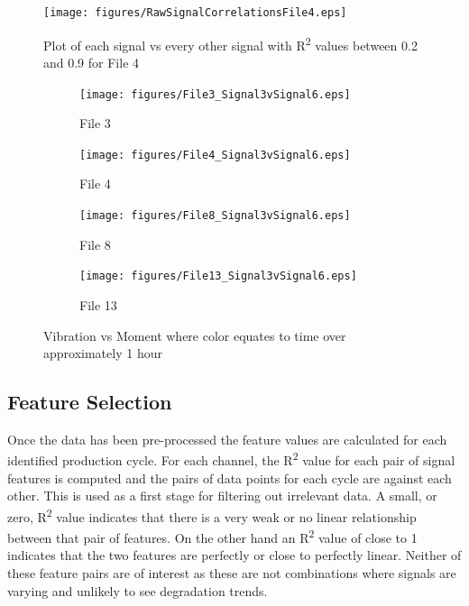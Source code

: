 \documentclass[]{article}
\begin{document}
\begin{figure}[H]
    \centering
    \texttt{[image: figures/RawSignalCorrelationsFile4.eps]}
    \caption{Plot of each signal vs every other signal with R\textsuperscript{2} values between 0.2 and 0.9 for File 4}
    \label{fig:RawSignalCorrelationsFile1}
\end{figure}


\begin{figure}[H]
	\captionsetup[subfigure]{justification=Centering}
    \centering
		\begin{subfigure}{.45\textwidth}
		  	\centering
    			\texttt{[image: figures/File3\_Signal3vSignal6.eps]}
		  	\caption{File 3}
		  	\label{fig:File3_Signal3vSignal6}
		\end{subfigure}
		\hspace{\fill}
		\begin{subfigure}{.45\textwidth}
		  	\centering
 		   	\texttt{[image: figures/File4\_Signal3vSignal6.eps]}
		  	\caption{File 4}
		  	\label{fig:File4_Signal3vSignal6}
		\end{subfigure}  
	\bigskip    
    \centering
		\begin{subfigure}{.45\textwidth}
		  	\centering
    			\texttt{[image: figures/File8\_Signal3vSignal6.eps]}
		  	\caption{File 8}
		  	\label{fig:File8_Signal3vSignal6}
		\end{subfigure}
		\hspace{\fill}
		\begin{subfigure}{.45\textwidth}
		  	\centering
 		   	\texttt{[image: figures/File13\_Signal3vSignal6.eps]}
		  	\caption{File 13}
		  	\label{fig:File13_Signal3vSignal6}
		\end{subfigure}
    \caption{Vibration vs Moment where color equates to time over approximately 1 hour}
    \label{fig:RawSignalCorrelationsFile1_Caption}    
\end{figure}

\subsection{Feature Selection}
Once the data has been pre-processed the feature values are calculated for each identified production cycle. For each channel, the R\textsuperscript{2} value for each pair of signal features is computed and the pairs of data points for each cycle are against each other. This is used as a first stage for filtering out irrelevant data. A small, or zero, R\textsuperscript{2} value indicates that there is a very weak or no linear relationship between that pair of features. On the other hand an R\textsuperscript{2} value of close to 1 indicates that the two features are perfectly or close to perfectly linear. Neither of these feature pairs are of interest as these are not combinations where signals are varying and unlikely to see degradation trends. 
\end{document}
